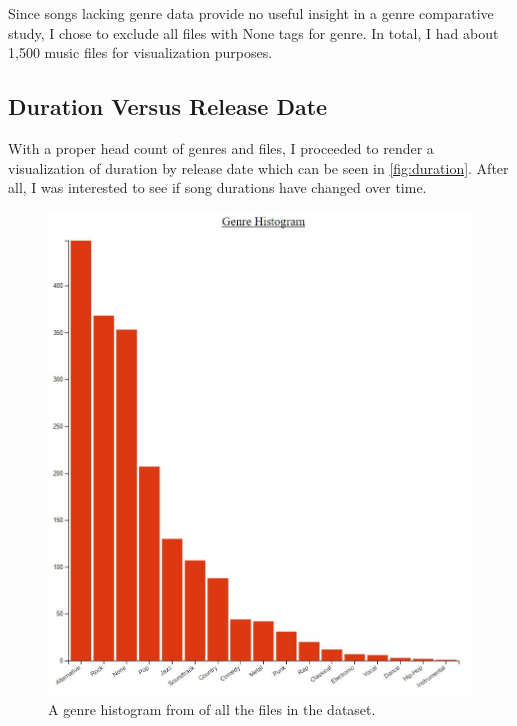 \documentclass[journal]{vgtc}                %
\begin{document}
Since songs lacking genre data provide no useful insight in a genre comparative
study, I chose to exclude all files with None tags for genre. In total, I had
about 1,500 music files for visualization purposes.

\subsection{Duration Versus Release Date}

With a proper head count of genres and files, I proceeded to render a
visualization of duration by release date which can be seen in
\autoref{fig:duration}. After all, I was interested to see if song durations
have changed over time.

\begin{figure}[h]
 \centering %
 \includegraphics[width=\columnwidth]{genre-histogram}
 \caption{A genre histogram from \cite{Grifski:2019} of all the files in the dataset.}
 \label{fig:duration}
\end{figure}
\end{document}
